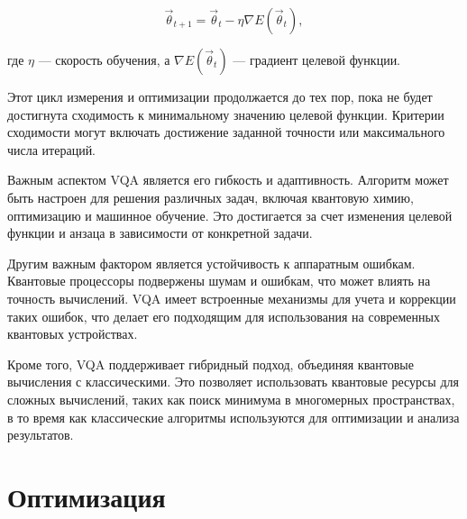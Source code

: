 \documentclass[a4paper]{report}
\begin{document}
\begin{equation}
\vec{\theta}_{t+1} = \vec{\theta}_t - \eta \nabla E(\vec{\theta}_t),
\end{equation}

где $\eta$ — скорость обучения, а $\nabla E(\vec{\theta}_t)$ — градиент целевой функции.

Этот цикл измерения и оптимизации продолжается до тех пор, пока не будет достигнута сходимость к минимальному значению целевой функции. Критерии сходимости могут включать достижение заданной точности или максимального числа итераций.

Важным аспектом VQA является его гибкость и адаптивность. Алгоритм может быть настроен для решения различных задач, включая квантовую химию, оптимизацию и машинное обучение. Это достигается за счет изменения целевой функции и анзаца в зависимости от конкретной задачи.

Другим важным фактором является устойчивость к аппаратным ошибкам. Квантовые процессоры подвержены шумам и ошибкам, что может влиять на точность вычислений. VQA имеет встроенные механизмы для учета и коррекции таких ошибок, что делает его подходящим для использования на современных квантовых устройствах.

Кроме того, VQA поддерживает гибридный подход, объединяя квантовые вычисления с классическими. Это позволяет использовать квантовые ресурсы для сложных вычислений, таких как поиск минимума в многомерных пространствах, в то время как классические алгоритмы используются для оптимизации и анализа результатов.


\section{Оптимизация}

\end{document}
